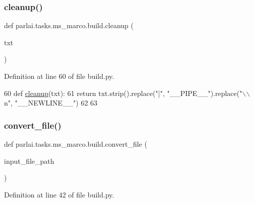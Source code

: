 \subsubsection{\texorpdfstring{cleanup()}{cleanup()}}
{\footnotesize\ttfamily def parlai.\+tasks.\+ms\+\_\+marco.\+build.\+cleanup (\begin{DoxyParamCaption}\item[{}]{txt }\end{DoxyParamCaption})}



Definition at line 60 of file build.\+py.


\begin{DoxyCode}
60 \textcolor{keyword}{def }\hyperlink{namespaceparlai_1_1tasks_1_1ms__marco_1_1build_a6c94ade2f99fa70bf4103a22a1fbdc42}{cleanup}(txt):
61     \textcolor{keywordflow}{return} txt.strip().replace(\textcolor{stringliteral}{"|"}, \textcolor{stringliteral}{"\_\_PIPE\_\_"}).replace(\textcolor{stringliteral}{"\(\backslash\)\(\backslash\)n"}, \textcolor{stringliteral}{"\_\_NEWLINE\_\_"})
62 
63 
\end{DoxyCode}
\mbox{\label{namespaceparlai_1_1tasks_1_1ms__marco_1_1build_ac19db5d0ad4ba8559f6aca64f2fe192b}} 
\subsubsection{\texorpdfstring{convert\+\_\+file()}{convert\_file()}}
{\footnotesize\ttfamily def parlai.\+tasks.\+ms\+\_\+marco.\+build.\+convert\+\_\+file (\begin{DoxyParamCaption}\item[{}]{input\+\_\+file\+\_\+path }\end{DoxyParamCaption})}



Definition at line 42 of file build.\+py.


